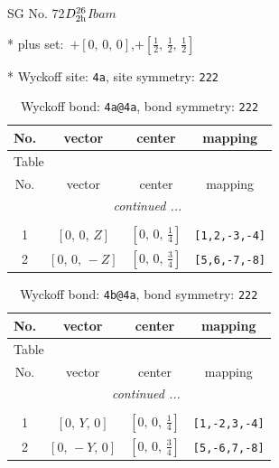 \documentclass[fleqn,8pt]{jsarticle}
\begin{document}
\setcounter{MaxMatrixCols}{32}

\renewcommand{\tablename}{Table~}
\renewcommand{\figurename}{Figure~}
\begin{center}
\LARGE
SG No. 72\quad$D_{\rm 2h}^{26}$\quad$Ibam$\quad[ orthorhombic ]
\end{center}

* plus set:\,\,\,$+\left[ 0,\, 0,\, 0 \right]$,\quad $+\left[ \frac{1}{2},\, \frac{1}{2},\, \frac{1}{2} \right]$


* Wyckoff site: {\tt 4a}, site symmetry: {\tt 222}
\renewcommand{\arraystretch}{1.2}
\begin{longtable}{cccc}
\caption{Wyckoff bond: {\tt 4a@4a}, bond symmetry: {\tt 222}}
 \\
 \hline \hline
No. & vector & center & mapping \\ \hline \endfirsthead

\multicolumn{3}{l}{\tablename\ \thetable{}} \\
 \hline \hline
No. & vector & center & mapping \\ \hline \endhead

 \hline \hline
\multicolumn{3}{r}{\footnotesize\it continued ...} \\ \endfoot

 \hline \hline
\multicolumn{3}{r}{} \\ \endlastfoot

1 & $\left[ 0,\, 0,\, Z \right]$ & $\left[ 0,\, 0,\, \frac{1}{4} \right]$ & {\tt [1,2,-3,-4]} \\ \hline
2 & $\left[ 0,\, 0,\, - Z \right]$ & $\left[ 0,\, 0,\, \frac{3}{4} \right]$ & {\tt [5,6,-7,-8]} \\
\end{longtable}
\renewcommand{\arraystretch}{1.2}
\begin{longtable}{cccc}
\caption{Wyckoff bond: {\tt 4b@4a}, bond symmetry: {\tt 222}}
 \\
 \hline \hline
No. & vector & center & mapping \\ \hline \endfirsthead

\multicolumn{3}{l}{\tablename\ \thetable{}} \\
 \hline \hline
No. & vector & center & mapping \\ \hline \endhead

 \hline \hline
\multicolumn{3}{r}{\footnotesize\it continued ...} \\ \endfoot

 \hline \hline
\multicolumn{3}{r}{} \\ \endlastfoot

1 & $\left[ 0,\, Y,\, 0 \right]$ & $\left[ 0,\, 0,\, \frac{1}{4} \right]$ & {\tt [1,-2,3,-4]} \\ \hline
2 & $\left[ 0,\, - Y,\, 0 \right]$ & $\left[ 0,\, 0,\, \frac{3}{4} \right]$ & {\tt [5,-6,7,-8]} \\
\end{longtable}
\end{document}
